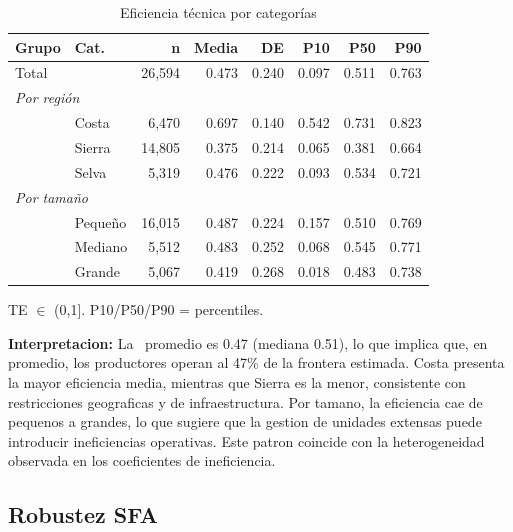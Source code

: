 \documentclass[10pt,a4paper]{article}
\newcommand{\TE}{\text{TE}}
\begin{document}
\begin{table}[H]
\centering
\caption{Eficiencia técnica por categorías}
\label{tab:te_stats}
\begin{threeparttable}
\small
\begin{tabular}{llrrrrrr}
\toprule
\textbf{Grupo} & \textbf{Cat.} & \textbf{n} & \textbf{Media} & \textbf{DE} & \textbf{P10} & \textbf{P50} & \textbf{P90} \\
\midrule
Total & & 26,594 & 0.473 & 0.240 & 0.097 & 0.511 & 0.763 \\
\midrule
\multicolumn{8}{l}{\textit{Por región}} \\
& Costa & 6,470 & 0.697 & 0.140 & 0.542 & 0.731 & 0.823 \\
& Sierra & 14,805 & 0.375 & 0.214 & 0.065 & 0.381 & 0.664 \\
& Selva & 5,319 & 0.476 & 0.222 & 0.093 & 0.534 & 0.721 \\
\midrule
\multicolumn{8}{l}{\textit{Por tamaño}} \\
& Pequeño & 16,015 & 0.487 & 0.224 & 0.157 & 0.510 & 0.769 \\
& Mediano & 5,512 & 0.483 & 0.252 & 0.068 & 0.545 & 0.771 \\
& Grande & 5,067 & 0.419 & 0.268 & 0.018 & 0.483 & 0.738 \\
\bottomrule
\end{tabular}
\begin{tablenotes}
\footnotesize
\item TE $\in$ (0,1]. P10/P50/P90 = percentiles.
\end{tablenotes}
\end{threeparttable}
\end{table}

\textbf{Interpretacion:} La \TE\ promedio es 0.47 (mediana 0.51), lo que implica que, en promedio, los productores operan al 47\% de la frontera estimada. Costa presenta la mayor eficiencia media, mientras que Sierra es la menor, consistente con restricciones geograficas y de infraestructura. Por tamano, la eficiencia cae de pequenos a grandes, lo que sugiere que la gestion de unidades extensas puede introducir ineficiencias operativas. Este patron coincide con la heterogeneidad observada en los coeficientes de ineficiencia.

\subsection{Robustez SFA}
\end{document}
